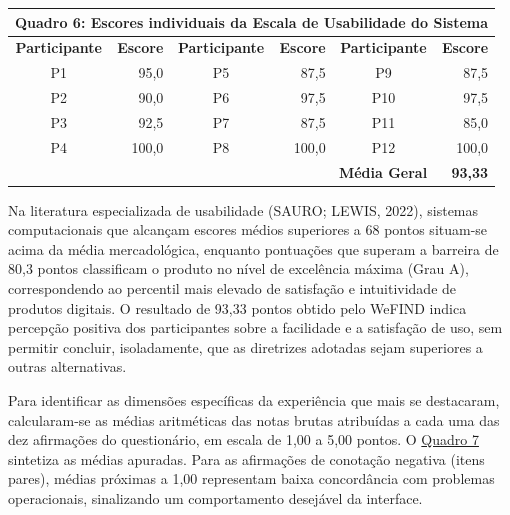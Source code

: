 \begin{table}[H]
    \centering
    \hypertarget{quadro:escores_sus}{}\label{quadro:escores_sus}
    \small
    \renewcommand{\arraystretch}{1.15}
    \begin{tabular}{|c|r|c|r|c|r|}
        \hline
        \multicolumn{6}{|c|}{\textbf{Quadro 6: Escores individuais da Escala de Usabilidade do Sistema}} \\ \hline
        \textbf{Participante} & \textbf{Escore} &
        \textbf{Participante} & \textbf{Escore} &
        \textbf{Participante} & \textbf{Escore} \\ \hline
        P1 & 95,0 & P5 & 87,5 & P9 & 87,5 \\ \hline
        P2 & 90,0 & P6 & 97,5 & P10 & 97,5 \\ \hline
        P3 & 92,5 & P7 & 87,5 & P11 & 85,0 \\ \hline
        P4 & 100,0 & P8 & 100,0 & P12 & 100,0 \\ \hline
        \multicolumn{5}{|r|}{\textbf{Média Geral}} & \textbf{93,33} \\ \hline
    \end{tabular}
\end{table}

Na literatura especializada de usabilidade (SAURO; LEWIS, 2022), sistemas computacionais que alcançam escores médios superiores a 68 pontos situam-se acima da média mercadológica, enquanto pontuações que superam a barreira de 80,3 pontos classificam o produto no nível de excelência máxima (Grau A), correspondendo ao percentil mais elevado de satisfação e intuitividade de produtos digitais. O resultado de 93,33 pontos obtido pelo WeFIND indica percepção positiva dos participantes sobre a facilidade e a satisfação de uso, sem permitir concluir, isoladamente, que as diretrizes adotadas sejam superiores a outras alternativas.

Para identificar as dimensões específicas da experiência que mais se destacaram, calcularam-se as médias aritméticas das notas brutas atribuídas a cada uma das dez afirmações do questionário, em escala de 1,00 a 5,00 pontos. O \hyperref[quadro:medias_itens_sus]{Quadro 7} sintetiza as médias apuradas. Para as afirmações de conotação negativa (itens pares), médias próximas a 1,00 representam baixa concordância com problemas operacionais, sinalizando um comportamento desejável da interface.

